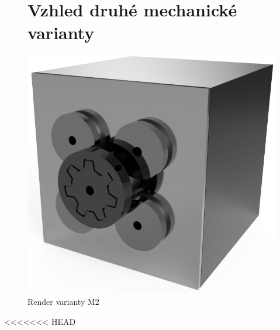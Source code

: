\begin{figure}
	\section{Vzhled druhé mechanické varianty}
	\vspace{\OdsazeniNadpisu}
    \centering
    \includegraphics[width=\textwidth]{kapitoly/obrazky/M2/predni_render.PNG}
    \caption{Render varianty M2}
    \label{fig:M2-render}
\end{figure}

<<<<<<< HEAD

